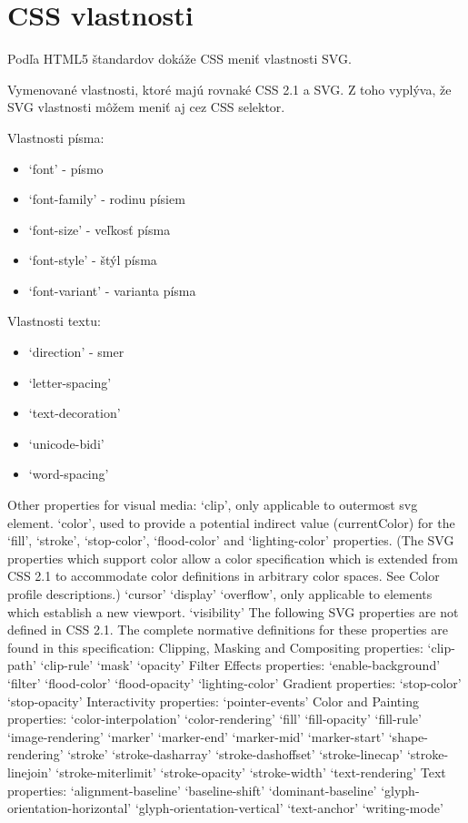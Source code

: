 \section{CSS vlastnosti}

Podľa HTML5 štandardov dokáže CSS meniť vlastnosti SVG.


Vymenované vlastnosti, ktoré majú rovnaké \acs{CSS} 2.1 a \acs{SVG}. Z toho vyplýva, že SVG vlastnosti môžem meniť aj cez CSS selektor. 

Vlastnosti písma:
\begin{itemize}
	\item 	‘font’ - písmo
	\item 	‘font-family’ - rodinu písiem
	\item 	‘font-size’ - veľkosť písma
	\item 	‘font-style’ - štýl písma
	\item 	‘font-variant’ - varianta písma
\end{itemize}

Vlastnosti textu: 
\begin{itemize}
\item 	‘direction’ - smer
\item 	‘letter-spacing’ 
\item 	‘text-decoration’
\item 	‘unicode-bidi’
\item 	‘word-spacing’
\end{itemize}

Other properties for visual media:
‘clip’, only applicable to outermost svg element.
‘color’, used to provide a potential indirect value (currentColor) for the ‘fill’, ‘stroke’, ‘stop-color’, ‘flood-color’ and ‘lighting-color’ properties. (The SVG properties which support color allow a color specification which is extended from CSS 2.1 to accommodate color definitions in arbitrary color spaces. See Color profile descriptions.)
‘cursor’
‘display’
‘overflow’, only applicable to elements which establish a new viewport.
‘visibility’
The following SVG properties are not defined in CSS 2.1. The complete normative definitions for these properties are found in this specification:
Clipping, Masking and Compositing properties:
‘clip-path’
‘clip-rule’
‘mask’
‘opacity’
Filter Effects properties:
‘enable-background’
‘filter’
‘flood-color’
‘flood-opacity’
‘lighting-color’
Gradient properties:
‘stop-color’
‘stop-opacity’
Interactivity properties:
‘pointer-events’
Color and Painting properties:
‘color-interpolation’
‘color-rendering’
‘fill’
‘fill-opacity’
‘fill-rule’
‘image-rendering’
‘marker’
‘marker-end’
‘marker-mid’
‘marker-start’
‘shape-rendering’
‘stroke’
‘stroke-dasharray’
‘stroke-dashoffset’
‘stroke-linecap’
‘stroke-linejoin’
‘stroke-miterlimit’
‘stroke-opacity’
‘stroke-width’
‘text-rendering’
Text properties:
‘alignment-baseline’
‘baseline-shift’
‘dominant-baseline’
‘glyph-orientation-horizontal’
‘glyph-orientation-vertical’
‘text-anchor’
‘writing-mode’
 


